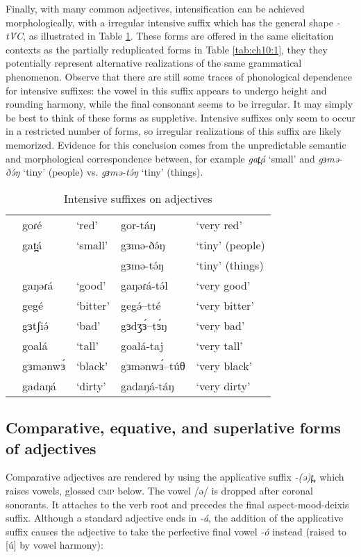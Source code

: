 Finally, with many common adjectives, intensification can be achieved morphologically, with a irregular intensive suffix which has the general shape \textit{-tV́C}, as illustrated in Table \ref{tab:ch10:2}. These forms are offered in the same elicitation contexts as the partially reduplicated forms in Table \ref{tab:ch10:1}, they they potentially represent alternative realizations of the same grammatical phenomenon. Observe that there are still some traces of phonological dependence for intensive suffixes: the vowel in this suffix appears to undergo height and rounding harmony, while the final consonant seems to be irregular. It may simply be best to think of these forms as suppletive. Intensive suffixes only seem to occur in a restricted number of forms, so irregular realizations of this suffix are likely memorized. Evidence for this conclusion comes from the unpredictable semantic and morphological correspondence between, for example \textit{gat̪á} `small' and \textit{gɜmə-ðə́ŋ }‘tiny’ (people)  vs. 	\textit{gɜmə-tə́ŋ}	‘tiny’ (things).

\begin{table}
\begin{tabular}{lllll}
&	goɾé&	‘red’		&	gor-táŋ			&	`very red'\\
&	gat̪á	&	‘small’		&	gɜmə-ðə́ŋ			&	‘tiny’ (people)\\
&			&			&	gɜmə-tə́ŋ			&	‘tiny’ (things)\\
&	gaŋəɾá	&	‘good’	&	gaŋəɾá-tə́l		&	‘very good’\\
&	gegé	&	‘bitter’&	gegə́--tté		&	‘very bitter’\\
&	gɜtʃiə́	&	‘bad’	&	gɜdʒɜ́--tɜ́ŋ		&	‘very bad’ \\
&	goalá	&	‘tall’	&	goalá-taj		&	`very tall'\\
&	gɜmənwɜ́	&	‘black’	&	gɜmənwɜ́--túθ		&	`very black'\\
&	gadaŋá	&	‘dirty’	&	gadaŋá-táŋ		&	‘very dirty’\\
\end{tabular}	
\caption{Intensive suffixes on adjectives}
\label{tab:ch10:2}
\end{table}



\subsection{Comparative, equative, and superlative forms of adjectives}\label{sec:ch10:comp}

Comparative adjectives are rendered by using the applicative suffix \textit{-(ə)t̪,} which raises vowels, glossed \textsc{\textsc{cmp}} below. The vowel /ə/ is dropped after coronal sonorants. It attaches to the verb root and precedes the final aspect-mood-deixis suffix. Although a standard adjective ends in \textit{-á}, the addition of the applicative suffix causes the adjective to take the perfective final vowel \textit{-ó} instead (raised to [ú] by vowel harmony):

